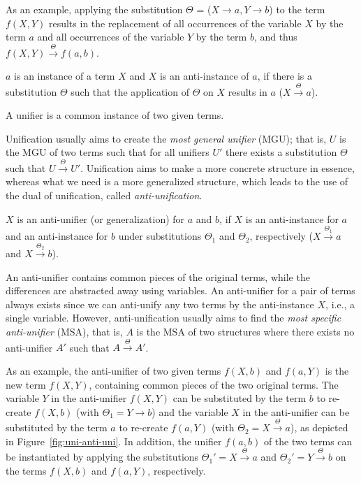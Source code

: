 As an example, applying the substitution $\Theta$ = ({$X \rightarrow a, Y \rightarrow b $})
to the term $f(X,Y)$ results in the replacement of all occurrences of the variable $X$ by the term $a$ and all occurrences of the variable $Y$ by the term $b$, and thus $f(X,Y)\xrightarrow{\Theta} f(a,b)$.

\begin{defn}\label{def:instance}
$a$ is an instance of a term $X$ and $X$ is an anti-instance of $a$, if there is a substitution $\Theta$ such that the application of $\Theta$ on $X$ results in $a$ ($X\xrightarrow{\Theta}a$).
\end{defn}

\begin{defn}[Unifier]\label{def:unifier}
A unifier is a common instance of two given terms.
\end{defn}

Unification usually aims to create the \emph{most general unifier} (MGU); that is, $U$ is the MGU of two terms such that for all unifiers $U'$ there exists a substitution $\Theta$ such that $U\xrightarrow{\Theta}U'$. Unification aims to make a more concrete structure in essence, whereas what we need is a more generalized structure, which leads to the use of the dual of unification, called \emph{anti-unification}.

\begin{defn}\label{def:generalization}
$X$ is an anti-unifier (or generalization) for $a$ and $b$, if $X$ is an anti-instance for $a$ and an anti-instance for $b$ under substitutions $\Theta_1$ and $\Theta_2$, respectively ($X\xrightarrow{\Theta_1}a$ and $X\xrightarrow{\Theta_2}b$).
\end{defn}

An anti-unifier contains common pieces of the original terms, while the differences are abstracted away using variables. An anti-unifier for a pair of terms always exists since we can anti-unify any two terms by the anti-instance $X$, i.e., a single variable. However, anti-unification usually aims to find the \emph{most specific anti-unifier} (MSA), that is, $A$ is the MSA of two structures where there exists no anti-unifier $A'$ such that $A\xrightarrow{\Theta}A'$.

As an example, the anti-unifier of two given terms $f(X,b)$ and $f(a,Y)$ is the new term $f(X,Y)$, containing common pieces of the two original terms. The variable $Y$ in the anti-unifier $f(X,Y)$ can be substituted by the term $b$ to re-create $f(X,b)$ (with $\Theta_1 = Y\xrightarrow{}b$) and the variable $X$ in the anti-unifier can be substituted by the term $a$ to re-create $f(a,Y)$
(with $\Theta_2 = X\xrightarrow{\Theta}a$), as depicted in Figure~\ref{fig:uni-anti-uni}.
In addition, the unifier $f(a,b)$ of the two terms can be instantiated by applying the substitutions $\Theta_1'=X\xrightarrow{\Theta}a$ and $\Theta_2'=Y\xrightarrow{\Theta}b$ on the terms $f(X,b)$ and $f(a,Y)$, respectively.

